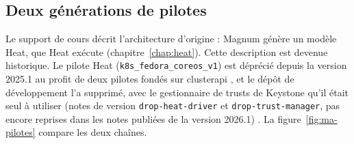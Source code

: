 \subsection{Deux générations de pilotes}\label{sec:ma-pilotes}

Le support de cours décrit l'architecture d'origine : Magnum génère un modèle Heat, que Heat exécute (chapitre~\ref{chap:heat}).
Cette description est devenue historique. Le pilote Heat (\texttt{k8s\_\allowbreak fedora\_\allowbreak coreos\_\allowbreak v1}) est déprécié depuis la
version 2025.1 au profit de deux pilotes fondés sur \gls{clusterapi} \parencite{magnum-relnotes-2025-1,magnum-user}, et le dépôt
de développement l'a supprimé, avec le gestionnaire de trusts de Keystone qu'il était seul à utiliser (notes de version
\texttt{drop-heat-driver} et \texttt{drop-trust-manager}, pas encore reprises dans les notes publiées de la version 2026.1)
\parencite{magnum-source,magnum-relnotes}. La figure~\ref{fig:ma-pilotes} compare les deux chaînes.

